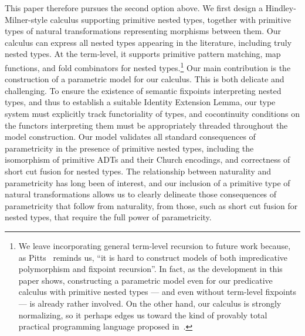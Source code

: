 \documentclass{lmcs}
\theoremstyle{plain}\newtheorem{satz}[thm]{Satz}
\begin{document}
{This paper therefore pursues the second option above.  We first design
a Hindley-Milner-style calculus supporting primitive nested types,
together with primitive types of natural transformations representing
morphisms between them. Our calculus can express all nested types
appearing in the literature, including truly nested types.  At the
term-level, it supports primitive pattern matching, map functions, and
fold combinators for nested types.\footnote{We leave incorporating
  general term-level recursion to future work because, as
  Pitts~\cite{pit00} reminds us, ``it is hard to construct models of
  both impredicative polymorphism and fixpoint recursion''. In fact,
  as the development in this paper shows, constructing a parametric
  model even for our predicative calculus with primitive nested types
  --- and even without term-level fixpoints --- is already rather
  involved. On the other hand, our calculus is strongly normalizing,
  so it perhaps edges us toward the kind of provably total practical
  programming language proposed in~\cite{wad89}.}  Our main
contribution is the construction of a parametric model for our
calculus. This is both delicate and challenging. To ensure the
existence of semantic fixpoints interpreting nested types, and thus to
establish a suitable Identity Extension Lemma, our type system must
explicitly track functoriality of types, and cocontinuity conditions
on the functors interpreting them must be appropriately threaded
throughout the model construction. Our model validates all standard
consequences of parametricity in the presence of primitive nested
types, including the isomorphism of primitive ADTs and their Church
encodings, and correctness of short cut fusion for nested types. The
relationship between naturality and parametricity has long been of
interest, and our inclusion of a primitive type of natural
transformations allows us to clearly delineate those consequences of
parametricity that follow from naturality, from those, such as short
cut fusion for nested types, that require the full power of
parametricity.

\vspace*{0.1in}

}
\end{document}
